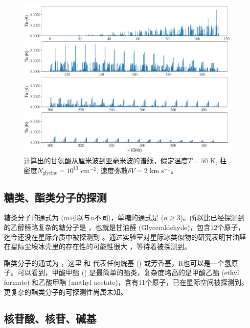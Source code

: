 \documentclass[a4paper]{article}
\begin{document}
\begin{figure}[htbp]
\centering
\includegraphics[width=0.95\linewidth]{glycine_50K_1e13_10e5_2e5.pdf}
\caption{计算出的甘氨酸从厘米波到亚毫米波的谱线，假定温度$T=50$ K, 柱密度$N_\text{glycine}=10^{13}$ cm$^{-2}$, 速度弥散$\delta V=2$ km s$^{-1}$。\label{figGlycine}}
\end{figure}

\subsection{糖类、酯类分子的探测}

糖类分子的通式为  ($m$可以与$n$不同)，单糖的通式是  ($n\ge3$)。所以比已经探测到的乙醇醛略复杂的糖分子是 ，也就是甘油醛 (Glyceraldehyde)，包含12个原子，迄今还没在星际介质中被探测到 \citep{Hollis2004}。通过实验室对星际冰类似物的研究表明甘油醛在星际尘埃冰壳里的存在性的可能性很大 \citep{deMarcellus2015}，等待着被探测到。

酯类分子的通式为 ，这里  和  代表任何烷基 () 或芳香基，R也可以是一个氢原子。可以看到，甲酸甲酯 () 是最简单的酯类，复杂度略高的是甲酸乙酯 (ethyl formate) 和乙酸甲酯 (methyl acetate)，含有11个原子，已在星际空间被探测到。更复杂的酯类分子的可探测性尚属未知。

\subsection{核苷酸、核苷、碱基}
\end{document}
